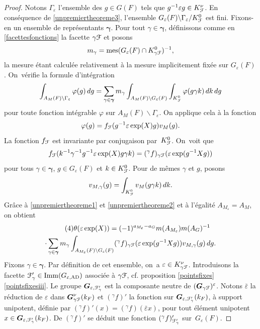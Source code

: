 \documentclass[11pt]{article}
\newcommand{\cf}{cf.\xspace}
\numberwithin{equation}{section}\providecommand{\og}{«\,}\providecommand{\fg}{\,»}
\let\mathcal \EuScript
\let\epsilon\varepsilon
\newcommand{\AD}{\mathrm{AD}}
\newcommand{\Imm}{\mathrm{Imm}}
\DeclareMathOperator{\mes}{mes}
\newcommand{\bG}{\boldsymbol{G}}
\newcommand{\cF}{\mathcal{F}}
\theoremstyle{plain}
\theoremstyle{definition}
\begin{document}
\begin{proof}
Notons $\Gamma_{\epsilon}$ l'ensemble des $g\in G(F)$ tels que $g^{-1}\epsilon g\in K_{\cF}^{\nu}$. En conséquence de \eqref{unpremiertheoreme3}, l'ensemble $G_{\epsilon}(F)\backslash \Gamma_{\epsilon}/K_{\cF}^0$ est fini. Fixons-en un ensemble de représentants $\boldsymbol{\gamma}$. Pour tout $\gamma\in \boldsymbol{\gamma}$, définissons comme en \ref{facettesfonctions} la facette $\gamma\cF$ et posons
\[
m_{\gamma}=\mes(G_{\epsilon}(F)\cap K_{\gamma\cF}^0)^{-1},
\]
la mesure étant calculée relativement à la mesure implicitement fixée sur $G_{\epsilon}(F)$. On~vérifie la formule d'intégration\vspace*{-3pt}
\[
\int_{A_{M}(F)\backslash\Gamma_{\epsilon}}\varphi(g)\,dg=\sum_{\gamma\in \boldsymbol{\gamma}}m_{\gamma}\int_{A_{M}(F)\backslash G_{\epsilon}(F)}\int_{K_{\cF}^0}\varphi(g\gamma k)\,dk\,dg
\]
pour toute fonction intégrable $\varphi$ sur $A_{M}(F)\backslash \Gamma_{\epsilon}$. On applique cela à la fonction\vspace*{-3pt}\enlargethispage{.5\baselineskip}%
\[
\varphi(g)=f_{\cF}(g^{-1}\epsilon \exp(X) g)v_{M}(g).
\]
La fonction $f_{\cF} $ est invariante par conjugaison par~$K_{\cF}^0$. On~voit que\vspace*{-3pt}
\[
f_{\cF}(k^{-1}\gamma^{-1}g^{-1}\epsilon \exp(X)g \gamma k)=(^{\gamma}f)_{\gamma\cF}(\epsilon \exp(g^{-1}Xg))
\]
pour tous $\gamma\in \boldsymbol{\gamma}$, $g\in G_{\epsilon}(F)$ et $k\in K_{\cF}^0$. Pour de mêmes
$\gamma$ et $g$, posons\vspace*{-3pt}
\[
v_{M,\gamma}(g)=\int_{K_{\cF}^0}v_{M}(g\gamma k)\,dk.
\]
Grâce à \eqref{unpremiertheoreme1} et \eqref{unpremiertheoreme2} et à l'égalité $A_{M_{\epsilon}}=A_{M}$, on obtient\vspace*{-3pt}
\begin{multline*}\tag{4}\label{unpremiertheoreme4}
\theta(\epsilon \exp(X))=(-1)^{a_{M_{\epsilon}}-a_{G}}m(A_{M_{\epsilon}})m(A_{G})^{-1}\\
\cdot\sum_{\gamma\in \boldsymbol{\gamma}}m_{\gamma}
\int_{A_{M_{\epsilon}}(F)\backslash G_{\epsilon}(F)}(^{\gamma}f)_{\gamma\cF}(\epsilon \exp(g^{-1}X g))v_{M,\gamma} (g)\,dg.
\end{multline*}
Fixons $\gamma\in \boldsymbol{\gamma}$.
Par définition de cet ensemble, on~a $\epsilon\in K_{\gamma\cF}^{\nu}$. Introduisons la facette $\cF'_{\gamma}\in \Imm(G_{\epsilon,\AD})$ associée à $\gamma\cF$, \cf proposition \ref{pointsfixes}\,\eqref{pointsfixesiii}. Le groupe $\bG_{\epsilon,\cF_{\gamma}'}$ est la composante neutre de $(\bG_{\gamma\cF})^{\epsilon}$.
Notons $\bar{\epsilon}$ la réduction de $\epsilon$ dans $\bG^{\nu}_{\gamma\cF}(k_{F})$ et $(^{\gamma}f)'$ la fonction sur $\bG_{\epsilon,\cF'_{\gamma}}(k_{F})$, à support unipotent, définie par $(^{\gamma}f)'(x)=(^{\gamma}f)(\bar{\epsilon}x)$, pour tout élément unipotent $x\in \bG_{\epsilon,\cF'_{\gamma}}(k_{F})$. De $(^{\gamma}f)'$ se déduit une fonction $(^{\gamma}f)'_{\cF'_{\gamma}}$ sur~$G_{\epsilon}(F)$.


\end{proof}
\end{document}
